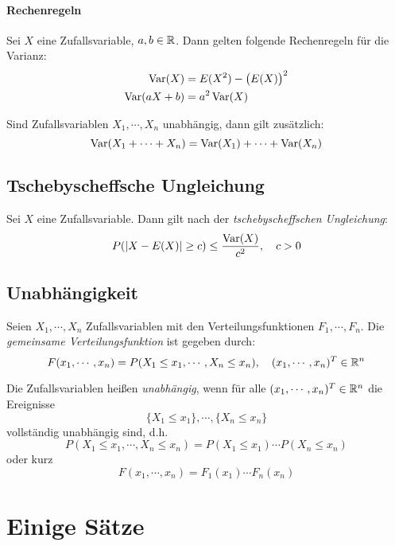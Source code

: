 				\paragraph{Rechenregeln}
					Sei \(X\) eine Zufallsvariable, \( a, b \in \mathbb{R} \). Dann gelten folgende Rechenregeln für die Varianz:
					\begin{align*}
						\operatorname{Var}(X)      & = E(X^2) - \big(E(X)\big)^2 \\
						\operatorname{Var}(aX + b) & = a^2 \operatorname{Var}(X)
					\end{align*}

					Sind Zufallsvariablen \( X_1, \cdots, X_n \) unabhängig, dann gilt zusätzlich:
					\begin{equation*}
						\operatorname{Var}(X_1 + \cdots + X_n) = \operatorname{Var}(X_1) + \cdots + \operatorname{Var}(X_n)
					\end{equation*}

		\subsection{Tschebyscheffsche Ungleichung}
			Sei \( X \) eine Zufallsvariable. Dann gilt nach der \textit{tschebyscheffschen Ungleichung}:
			\begin{equation*}
				P(\abs{X - E(X)} \geq c) \leq \frac{\operatorname{Var}(X)}{c^2}, \quad c > 0
			\end{equation*}

		\subsection{Unabhängigkeit}
			Seien \( X_1, \cdots, X_n \) Zufallsvariablen mit den Verteilungsfunktionen \( F_1, \cdots, F_n \). Die \textit{gemeinsame Verteilungsfunktion} ist gegeben durch:
			\begin{equation*}
				F(x_1, \cdots, x_n) = P(X_1 \leq x_1, \cdots, X_n \leq x_n), \quad (x_1, \cdots, x_n)^T \in \mathbb{R}^n
			\end{equation*}

			Die Zufallsvariablen heißen \textit{unabhängig}, wenn für alle \( (x_1, \cdots, x_n)^T \in \mathbb{R}^n \) die Ereignisse \[ \{ X_1 \leq x_1 \}, \cdots, \{ X_n \leq x_n \} \] vollständig unabhängig sind, d.h. \[ P(X_1 \leq x_1, \cdots, X_n \leq x_n) = P(X_1 \leq x_1) \cdots P(X_n \leq x_n) \] oder kurz \[ F(x_1, \cdots, x_n) = F_1(x_1) \cdots F_n(x_n) \]

	\section{Einige Sätze}
